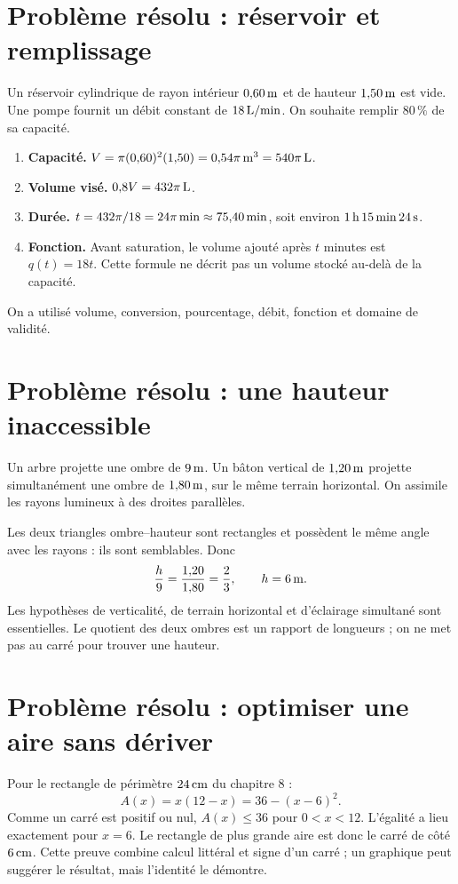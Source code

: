 \documentclass[../cours_3e.tex]{subfiles}
\begin{document}
\section{Problème résolu : réservoir et remplissage}
Un réservoir cylindrique de rayon intérieur $0{,}60\,\mathrm{m}$ et de hauteur $1{,}50\,\mathrm{m}$ est vide. Une pompe fournit un débit constant de $18\,\mathrm{L/min}$. On souhaite remplir $80\,\%$ de sa capacité.
\begin{enumerate}
\item \textbf{Capacité.} $V=\pi(0{,}60)^2(1{,}50)=0{,}54\pi\,\mathrm{m^3}=540\pi\,\mathrm{L}$.
\item \textbf{Volume visé.} $0{,}8V=432\pi\,\mathrm{L}$.
\item \textbf{Durée.} $t=432\pi/18=24\pi\,\mathrm{min}\approx75{,}40\,\mathrm{min}$, soit environ $1\,\mathrm{h}\,15\,\mathrm{min}\,24\,\mathrm{s}$.
\item \textbf{Fonction.} Avant saturation, le volume ajouté après $t$ minutes est $q(t)=18t$. Cette formule ne décrit pas un volume stocké au-delà de la capacité.
\end{enumerate}
On a utilisé volume, conversion, pourcentage, débit, fonction et domaine de validité.
\section{Problème résolu : une hauteur inaccessible}
Un arbre projette une ombre de $9\,\mathrm{m}$. Un bâton vertical de $1{,}20\,\mathrm{m}$ projette simultanément une ombre de $1{,}80\,\mathrm{m}$, sur le même terrain horizontal. On assimile les rayons lumineux à des droites parallèles.

Les deux triangles ombre--hauteur sont rectangles et possèdent le même angle avec les rayons : ils sont semblables. Donc
\[\frac h9=\frac{1{,}20}{1{,}80}=\frac23,\qquad h=6\,\mathrm{m}.\]
Les hypothèses de verticalité, de terrain horizontal et d'éclairage simultané sont essentielles. Le quotient des deux ombres est un rapport de longueurs ; on ne met pas au carré pour trouver une hauteur.
\section{Problème résolu : optimiser une aire sans dériver}
\approfondissement Pour le rectangle de périmètre $24\,\mathrm{cm}$ du chapitre 8 :
\[A(x)=x(12-x)=36-(x-6)^2.\]
Comme un carré est positif ou nul, $A(x)\leq36$ pour $0<x<12$. L'égalité a lieu exactement pour $x=6$. Le rectangle de plus grande aire est donc le carré de côté $6\,\mathrm{cm}$.
Cette preuve combine calcul littéral et signe d'un carré ; un graphique peut suggérer le résultat, mais l'identité le démontre.
\end{document}
